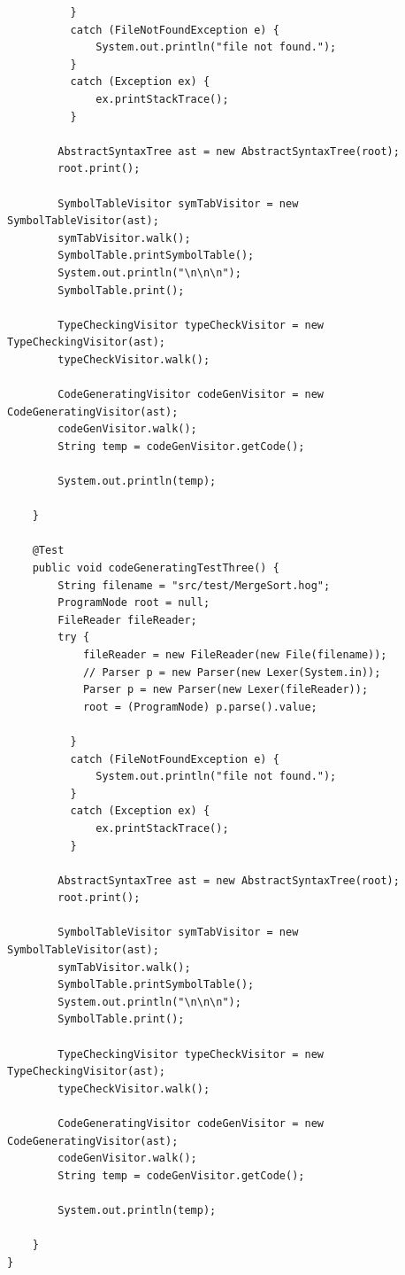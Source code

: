\documentclass{report}
\begin{document}
\begin{verbatim}
	      }
	      catch (FileNotFoundException e) {
	    	  System.out.println("file not found.");
	      }
	      catch (Exception ex) {
	    	  ex.printStackTrace();
	      }
	    
	    AbstractSyntaxTree ast = new AbstractSyntaxTree(root);
	    root.print();
	    
	    SymbolTableVisitor symTabVisitor = new SymbolTableVisitor(ast);
	    symTabVisitor.walk();
	    SymbolTable.printSymbolTable();
	    System.out.println("\n\n\n");
	    SymbolTable.print();
	    
	    TypeCheckingVisitor typeCheckVisitor = new TypeCheckingVisitor(ast);
	    typeCheckVisitor.walk();
	 
	    CodeGeneratingVisitor codeGenVisitor = new CodeGeneratingVisitor(ast);
	    codeGenVisitor.walk();
	    String temp = codeGenVisitor.getCode();
	    	    
		System.out.println(temp);

	}
	
	@Test
	public void codeGeneratingTestThree() {
		String filename = "src/test/MergeSort.hog";
		ProgramNode root = null;
		FileReader fileReader;
	    try {
	    	fileReader = new FileReader(new File(filename));
	        // Parser p = new Parser(new Lexer(System.in));
	    	Parser p = new Parser(new Lexer(fileReader));
	    	root = (ProgramNode) p.parse().value;
	    	
	      }
	      catch (FileNotFoundException e) {
	    	  System.out.println("file not found.");
	      }
	      catch (Exception ex) {
	    	  ex.printStackTrace();
	      }
	    
	    AbstractSyntaxTree ast = new AbstractSyntaxTree(root);
	    root.print();
	    
	    SymbolTableVisitor symTabVisitor = new SymbolTableVisitor(ast);
	    symTabVisitor.walk();
	    SymbolTable.printSymbolTable();
	    System.out.println("\n\n\n");
	    SymbolTable.print();
	    
	    TypeCheckingVisitor typeCheckVisitor = new TypeCheckingVisitor(ast);
	    typeCheckVisitor.walk();
	 
	    CodeGeneratingVisitor codeGenVisitor = new CodeGeneratingVisitor(ast);
	    codeGenVisitor.walk();
	    String temp = codeGenVisitor.getCode();
	    	    
		System.out.println(temp);

	}
}

\end{verbatim}
\end{document}
